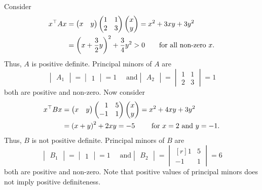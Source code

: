 \documentclass[12pt,class=book,crop=false]{standalone}
\begin{document}
\begin{ex}
    Consider
    \begin{align*}
        x^\top Ax & =\begin{pmatrix}
            x & y
        \end{pmatrix}\begin{pmatrix*}[r]
            1 & 1\\
            2 & 3
        \end{pmatrix*}\begin{pmatrix}
            x \\
            y
        \end{pmatrix}= x^2+3xy+3y^2 \\
                  & = \left(x+\frac{3}{2}y\right)^2+\frac{3}{4}y^2>0 \qquad\text{for all non-zero $ x $.}
    \end{align*}
    Thus, $ A $ is positive definite.
    Principal minors of $ A $ are
    \[
        \begin{vmatrix}
            A_1
        \end{vmatrix}=\begin{vmatrix}
            1
        \end{vmatrix}=1 \quad \text{ and} \begin{vmatrix}
            A_2
        \end{vmatrix}=\begin{vmatrix}
            1 & 1 \\
            2 & 3
        \end{vmatrix}=1
    \]
    both are positive and non-zero.
    Now consider
    \begin{align*}
        x^\top Bx & =\begin{pmatrix}
            x & y
        \end{pmatrix}\begin{pmatrix*}[r]
            1 & 5\\
            -1 & 1
        \end{pmatrix*}\begin{pmatrix}
            x \\
            y
        \end{pmatrix}= x^2+4xy+3y^2 \\
                  & = \left(x+y\right)^2+2xy=-5 \qquad\text{ for $ x=2 $ and $ y=-1 $.}
    \end{align*}
    Thus, $ B $ is not positive definite.
    Principal minors of $ B $ are
    \[
        \begin{vmatrix}
            B_1
        \end{vmatrix}=\begin{vmatrix}
            1
        \end{vmatrix}=1 \quad \text{ and} \begin{vmatrix}
            B_2
        \end{vmatrix}=\begin{vmatrix*}[r]
            1&5\\
            -1&1
        \end{vmatrix*}=6
    \]
    both are positive and non-zero.
    Note that positive values of principal minors does not imply positive definiteness.
\end{ex}
\end{document}
